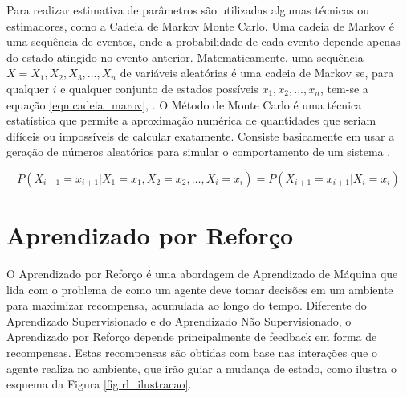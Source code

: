 Para realizar estimativa de parâmetros são utilizadas algumas técnicas ou estimadores, como a Cadeia de Markov Monte Carlo. Uma cadeia de Markov é uma sequência de eventos, onde a probabilidade de cada evento depende apenas do estado atingido no evento anterior. Matematicamente, uma sequência $X = {X_1, X_2, X_3, ..., X_n}$ de variáveis aleatórias é uma cadeia de Markov se, para qualquer $i$ e qualquer conjunto de estados possíveis $x_1, x_2, ..., x_n$, tem-se a equação \ref{eqn:cadeia_marov}, \cite{introducao_modelos_probabilisticos}. O Método de Monte Carlo é uma técnica estatística que permite a aproximação numérica de quantidades que seriam difíceis ou impossíveis de calcular exatamente. Consiste basicamente em usar a geração de números aleatórios para simular o comportamento de um sistema \cite{monte_carlo_statistical_methods}.

\begin{equation}
    \label{eqn:cadeia_marov}
        P(X_{i+1} = x_{i+1} | X_1 = x_1, X_2 = x_2, \ldots, X_i = x_i) = P(X_{i+1} = x_{i+1} | X_i = x_i)
\end{equation}



\section{Aprendizado por Reforço}
\label{sec:RL}
O Aprendizado por Reforço é uma abordagem de Aprendizado de Máquina que lida com o problema de como um agente deve tomar decisões em um ambiente para maximizar recompensa, acumulada ao longo do tempo. Diferente do Aprendizado Supervisionado e do Aprendizado Não Supervisionado, o Aprendizado por Reforço depende principalmente de feedback em forma de recompensas. Estas recompensas são obtidas com base nas interações que o agente realiza no ambiente, que irão guiar a mudança de estado, como ilustra o esquema da Figura \ref{fig:rl_ilustracao}.



